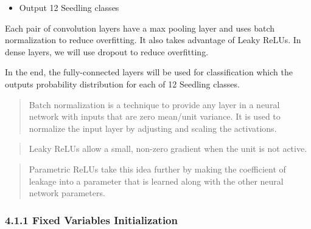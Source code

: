 \documentclass[11pt]{article}
\providecommand{\tightlist}{%
      \setlength{\itemsep}{0pt}\setlength{\parskip}{0pt}}
\begin{document}
\begin{itemize}
\tightlist
\item
  Output 12 Seedling classes
\end{itemize}

Each pair of convolution layers have a max pooling layer and uses batch
normalization to reduce overfitting. It also takes advantage of Leaky
ReLUs. In dense layers, we will use dropout to reduce overfitting.

In the end, the fully-connected layers will be used for classification
which the outputs probability distribution for each of 12 Seedling
classes.

\begin{quote}
Batch normalization is a technique to provide any layer in a neural
network with inputs that are zero mean/unit variance. It is used to
normalize the input layer by adjusting and scaling the activations.
\end{quote}

\begin{quote}
Leaky ReLUs allow a small, non-zero gradient when the unit is not
active.
\end{quote}

\begin{quote}
Parametric ReLUs take this idea further by making the coefficient of
leakage into a parameter that is learned along with the other neural
network parameters.
\end{quote}

    \hypertarget{fixed-variables-initialization}{%
\subsubsection{4.1.1 Fixed Variables
Initialization}\label{fixed-variables-initialization}}
\end{document}
